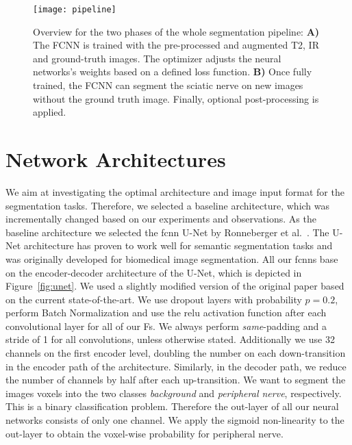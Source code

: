 \begin{figure}[htbp]
	\caption[Segmentation Pipeline]{Overview for the two phases of the whole segmentation pipeline: \textbf{A)} The FCNN is trained with the pre-processed and augmented T2, IR and ground-truth images. The optimizer adjusts the neural networks's weights based on a defined loss function. \textbf{B)} Once fully trained, the FCNN can segment the sciatic nerve on new images without the ground truth image. Finally, optional post-processing is applied.}
	\label{fig:pipeline}
	\texttt{[image: pipeline]}    
\end{figure}

\section{Network Architectures} \label{sec:architecture}
We aim at investigating the optimal architecture and image input format for the segmentation tasks. Therefore, we selected a baseline architecture, which was incrementally changed based on our experiments and observations. As the baseline architecture we selected the \gls{fcnn} U-Net by Ronneberger et al.~\cite{Ronneberger2015U-Net:Segmentation}. The U-Net architecture has proven to work well for semantic segmentation tasks and was originally developed for biomedical image segmentation. All our \gls{fcnn}s base on the encoder-decoder architecture of the U-Net, which is depicted in Figure~\ref{fig:unet}. We used a slightly modified version of the original paper based on the current state-of-the-art. We use dropout layers \cite{Srivastava2014Dropout:Overfitting} with probability $p = 0.2$, perform Batch Normalization \cite{SergeyIoffe2015BatchNormalization} and use the \gls{relu} activation function after each convolutional layer for all of our Fs. We always perform \textit{same}-padding and a stride of 1 for all convolutions, unless otherwise stated. Additionally we use 32 channels on the first encoder level, doubling the number on each down-transition in the encoder path of the architecture.
Similarly, in the decoder path, we reduce the number of channels by half after each up-transition. We want to segment the images voxels into the two classes \textit{background} and \textit{peripheral nerve}, respectively. This is a binary classification problem. Therefore the out-layer of all our neural networks consists of only one channel. We apply the sigmoid non-linearity to the out-layer to obtain the voxel-wise probability for peripheral nerve.\\
